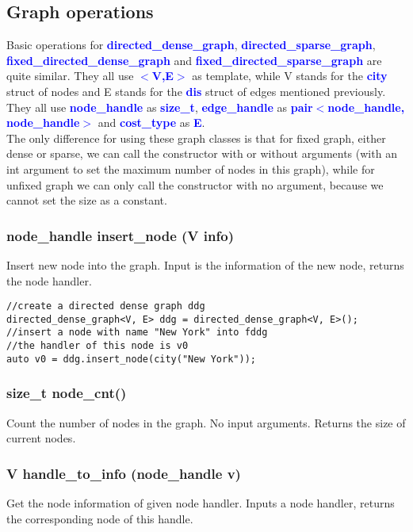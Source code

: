 \documentclass[]{article}
\begin{document}
\subsection{Graph operations}
Basic operations for \textbf{\textcolor{blue}{directed\_dense\_graph}}, \textbf{\textcolor{blue}{directed\_sparse\_graph}}, \textbf{\textcolor{blue}{fixed\_directed\_dense\_graph}} and \textbf{\textcolor{blue}{fixed\_directed\_sparse\_graph}} are quite similar. They all use \textbf{\textcolor{blue}{$<$V,E$>$}} as template, while V stands for the \textbf{\textcolor{blue}{city}} struct of nodes and E stands for the \textbf{\textcolor{blue}{dis}} struct of edges mentioned previously. They all use \textbf{\textcolor{blue}{node\_handle}} as \textbf{\textcolor{blue}{size\_t}}, \textbf{\textcolor{blue}{edge\_handle}} as \textbf{\textcolor{blue}{pair$<$node\_handle, node\_handle$>$}} and \textbf{\textcolor{blue}{cost\_type}} as \textbf{\textcolor{blue}{E}}.\\
The only difference for using these graph classes is that for fixed graph, either dense or sparse, we can call the constructor with or without arguments (with an int argument to set the maximum number of nodes in this graph), while for unfixed graph we can only call the constructor with no argument, because we cannot set the size as a constant.
\subsubsection{node\_handle insert\_node (V info)}
Insert new node into the graph.
Input is the information of the new node, returns the node handler.
\begin{lstlisting}
//create a directed dense graph ddg
directed_dense_graph<V, E> ddg = directed_dense_graph<V, E>();
//insert a node with name "New York" into fddg
//the handler of this node is v0
auto v0 = ddg.insert_node(city("New York")); 
\end{lstlisting}
\subsubsection{size\_t node\_cnt()}
Count the number of nodes in the graph.
No input arguments. Returns the size of current nodes.
\subsubsection{V handle\_to\_info (node\_handle v)}
Get the node information of given node handler.
Inputs a node handler, returns the corresponding node of this handle.
\end{document}
